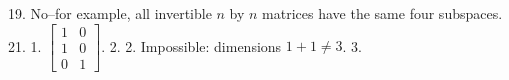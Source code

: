 19. No--for example, all invertible \(n\) by \(n\) matrices have the same four subspaces.
21. 1. \(\begin{bmatrix}1&0\\ 1&0\\ 0&1\end{bmatrix}\). 2. 2. Impossible: dimensions \(1+1\neq 3\). 3.

 